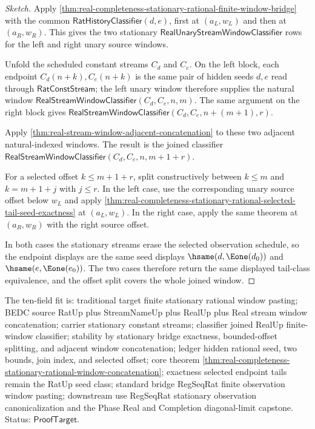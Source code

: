 \begin{proof}[Sketch]
Apply \autoref{thm:real-completeness-stationary-rational-finite-window-bridge}
with the common $\mathsf{RatHistoryClassifier}(d,e)$, first at
$(a_L,w_L)$ and then at $(a_R,w_R)$. This gives the two stationary
$\mathsf{RealUnaryStreamWindowClassifier}$ rows for the left and right unary
source windows.

Unfold the scheduled constant streams $C_d$ and $C_e$. On the left block, each
endpoint $C_d(n+k),C_e(n+k)$ is the same pair of hidden seeds $d,e$ read through
$\mathsf{RatConstStream}$; the left unary window therefore supplies the natural
window $\mathsf{RealStreamWindowClassifier}(C_d,C_e,n,m)$. The same argument
on the right block gives
$\mathsf{RealStreamWindowClassifier}(C_d,C_e,n+(m+1),r)$.

Apply \autoref{thm:real-stream-window-adjacent-concatenation} to these two
adjacent natural-indexed windows. The result is the joined classifier
$\mathsf{RealStreamWindowClassifier}(C_d,C_e,n,m+1+r)$.

For a selected offset $k\le m+1+r$, split constructively between $k\le m$ and
$k=m+1+j$ with $j\le r$. In the left case, use the corresponding unary source
offset below $w_L$ and apply
\autoref{thm:real-completeness-stationary-rational-selected-tail-seed-exactness}
at $(a_L,w_L)$. In the right case, apply the same theorem at $(a_R,w_R)$ with
the right source offset.

In both cases the stationary streams erase the selected observation schedule,
so the endpoint displays are the same seed displays
$\hsame(d,\Eone(d_0))$ and $\hsame(e,\Eone(e_0))$. The two cases therefore
return the same displayed tail-class equivalence, and the offset split covers
the whole joined window.
\end{proof}

The ten-field fit is: traditional target finite stationary rational window
pasting; BEDC source RatUp plus StreamNameUp plus RealUp plus Real stream
window concatenation; carrier stationary constant streams; classifier joined
RealUp finite-window classifier; stability by stationary bridge exactness,
bounded-offset splitting, and adjacent window concatenation; ledger hidden
rational seed, two bounds, join index, and selected offset; core theorem
\autoref{thm:real-completeness-stationary-rational-window-concatenation};
exactness selected endpoint tails remain the RatUp seed class; standard bridge
RegSeqRat finite observation window pasting; downstream use RegSeqRat
stationary observation canonicalization and the Phase Real and Completion
diagonal-limit capstone. Status: $\mathsf{ProofTarget}$.

